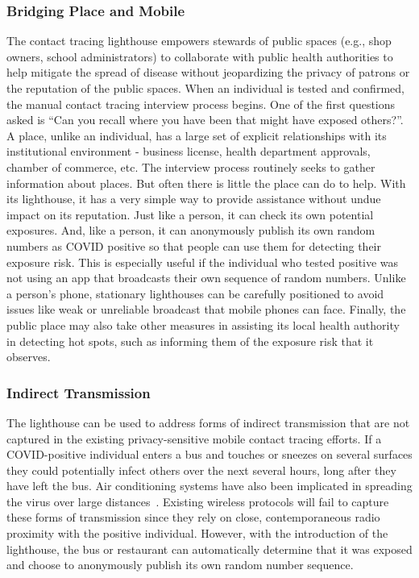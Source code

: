 
\subsubsection{Bridging Place and Mobile}
The contact tracing lighthouse empowers stewards of public spaces (e.g., shop owners, school administrators) to collaborate with public health authorities to help mitigate the spread of disease without jeopardizing the privacy of patrons or the reputation of the public spaces. When an individual is tested and confirmed, the manual contact tracing interview process begins. One of the first questions asked is “Can you recall where you have been that might have exposed others?”. A place, unlike an individual, has a large set of explicit relationships with its institutional environment - business license, health department approvals, chamber of commerce, etc. The interview process routinely seeks to gather information about places. But often there is little the place can do to help. With its lighthouse, it has a very simple way to provide assistance without undue impact on its reputation. Just like a person, it can check its own potential exposures. And, like a person, it can anonymously publish its own random numbers as COVID positive so that people can use them for detecting their exposure risk. This is especially useful if the individual who tested positive was not using an app that broadcasts their own sequence of random numbers. Unlike a person’s phone, stationary lighthouses can be carefully positioned to avoid issues like weak or unreliable broadcast that mobile phones can face. Finally, the public place may also take other measures in assisting its local health authority in detecting hot spots, such as informing them of the exposure risk that it observes.

\subsubsection{Indirect Transmission}
The lighthouse can be used to address forms of indirect transmission that are not captured in the existing privacy-sensitive mobile contact tracing efforts. If a COVID-positive individual enters a bus and touches or sneezes on several surfaces they could potentially infect others over the next several hours, long after they have left the bus. Air conditioning systems have also been implicated in spreading the virus over large distances~\cite{hvacTransmission}. Existing wireless protocols will fail to capture these forms of transmission since they rely on close, contemporaneous radio proximity with the positive individual. However, with the introduction of the lighthouse, the bus or restaurant can automatically determine that it was exposed and choose to anonymously publish its own random number sequence.

